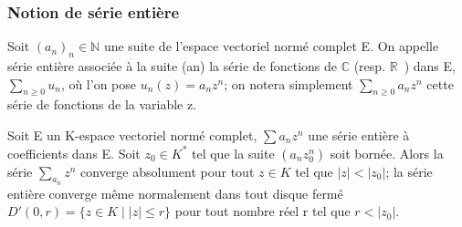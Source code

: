 
\subsubsection{Notion de série entière}
\label{sec:notion-de-serie}


%
%
%
%
%
\begin{de}
Soit $(a_n)_n \in \mathbb{N}$ une suite de l'espace
 vectoriel normé complet E. On appelle série entière associée à la suite
 (an) la série de fonctions de $\mathbb{C}$ (resp. $\mathbb{R}$~) dans E,
 $\sum_{n \geq 0} u_n$, où l'on pose $u_n(z) = a_n z^n$; on notera simplement
 $\sum_{n \geq 0} a_n z^n $ cette série de fonctions de la
 variable z.
 \end{de}
%
%
%
\begin{lem}[Abel]
Soit E un K-espace vectoriel normé complet,
$\sum a_n z^n$ une série entière à coefficients dans E. Soit
$z_0 \in K^*$ tel que la suite
$(a_n z_0^n)$ soit bornée. Alors la série
$\sum_a_n z^n$ converge absolument pour tout $z \in K$ tel que
$|z| < |z_0|$; la
série entière converge même normalement dans tout disque fermé $D'(0,r) =
\{ z \in
K∣|z|\leq r\} $
pour tout nombre réel r tel que $r <
|z_0|$.
\end{lem}
